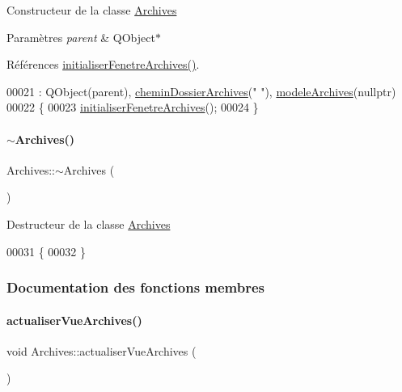 Constructeur de la classe \hyperlink{class_archives}{Archives} 
\begin{DoxyParams}{Paramètres}
{\em parent} & Q\+Object$\ast$ \\
\hline
\end{DoxyParams}


Références \hyperlink{class_archives_a1842ebad3721929949bc07be5144b79c}{initialiser\+Fenetre\+Archives()}.


\begin{DoxyCode}
00021                                   : QObject(parent), \hyperlink{class_archives_af155e5062883030cddaa05623a34854b}{cheminDossierArchives}(\textcolor{stringliteral}{" "}), 
      \hyperlink{class_archives_a61376e4ec330aea053fede230a1bc786}{modeleArchives}(\textcolor{keyword}{nullptr})
00022 \{
00023     \hyperlink{class_archives_a1842ebad3721929949bc07be5144b79c}{initialiserFenetreArchives}();
00024 \}
\end{DoxyCode}
\mbox{\label{class_archives_a08c9ded9bb3da731991c5526dcdb2548}} 
\paragraph{\texorpdfstring{$\sim$\+Archives()}{~Archives()}}
{\footnotesize\ttfamily Archives\+::$\sim$\+Archives (\begin{DoxyParamCaption}{ }\end{DoxyParamCaption})}

Destructeur de la classe \hyperlink{class_archives}{Archives} 
\begin{DoxyCode}
00031 \{
00032 \}
\end{DoxyCode}


\subsubsection{Documentation des fonctions membres}
\mbox{\label{class_archives_a380ac387d773b07ea5138347dbaca65a}} 
\paragraph{\texorpdfstring{actualiser\+Vue\+Archives()}{actualiserVueArchives()}}
{\footnotesize\ttfamily void Archives\+::actualiser\+Vue\+Archives (\begin{DoxyParamCaption}{ }\end{DoxyParamCaption})}

